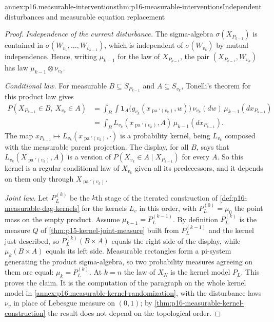 \begin{annexitem}{annex:p16.measurable-interventions}{thm:p16-measurable-interventions}{Independent disturbances and measurable equation replacement}
\begin{proof}
\emph{Independence of the current disturbance.} The sigma-algebra
\(\sigma(X_{P_{k-1}})\) is contained in
\(\sigma(W_{v_1},\ldots,W_{v_{k-1}})\), which is independent of
\(\sigma(W_{v_k})\) by mutual independence. Hence, writing \(\mu_{k-1}\)
for the law of \(X_{P_{k-1}}\), the pair \((X_{P_{k-1}},W_{v_k})\) has law
\(\mu_{k-1}\otimes\nu_{v_k}\).

\emph{Conditional law.} For measurable \(B\subseteq S_{P_{k-1}}\) and
\(A\subseteq S_{v_k}\), Tonelli's theorem for this product law gives
\[
\begin{aligned}
 P(X_{P_{k-1}}\in B,\ X_{v_k}\in A)
 &=\int_B\int\mathbf 1_A\bigl(g_{v_k}(x_{\operatorname{pa}'(v_k)},w)\bigr)
     \,\nu_{v_k}(dw)\,\mu_{k-1}(dx_{P_{k-1}})\\
 &=\int_B L_{v_k}(x_{\operatorname{pa}'(v_k)},A)\,
     \mu_{k-1}(dx_{P_{k-1}}).
\end{aligned}
\]
The map \(x_{P_{k-1}}\mapsto L_{v_k}(x_{\operatorname{pa}'(v_k)},\cdot)\)
is a probability kernel, being \(L_{v_k}\) composed with the measurable
parent projection. The display, for all \(B\), says that
\(L_{v_k}(X_{\operatorname{pa}'(v_k)},A)\) is a version of
\(P(X_{v_k}\in A\mid X_{P_{k-1}})\) for every \(A\). So this kernel is a
regular conditional law of \(X_{v_k}\) given all its predecessors, and it
depends on them only through \(X_{\operatorname{pa}'(v_k)}\).

\emph{Joint law.} Let \(P_L^{(k)}\) be the \(k\)th stage of the iterated
construction of \cref{def:p16-measurable-dag-kernels} for the kernels
\(L_v\) in this order, with \(P_L^{(0)}=\mu_0\) the point mass on the
empty product. Assume \(\mu_{k-1}=P_L^{(k-1)}\). By definition
\(P_L^{(k)}\) is the measure \(Q\) of \cref{thm:p15-kernel-joint-measure}
built from \(P_L^{(k-1)}\) and the kernel just described, so
\(P_L^{(k)}(B\times A)\) equals the right side of the display, while
\(\mu_k(B\times A)\) equals its left side. Measurable rectangles form a
pi-system generating the product sigma-algebra, so two probability
measures agreeing on them are equal: \(\mu_k=P_L^{(k)}\). At \(k=n\) the
law of \(X_N\) is the kernel model \(P_L\). This proves the claim. It is
the computation of the paragraph on the whole kernel model in
\cref{annex:p16.measurable-kernel-randomization}, with the disturbance
laws \(\nu_v\) in place of Lebesgue measure on \((0,1)\); by
\cref{thm:p16-measurable-kernel-construction} the result does not depend
on the topological order.


\end{proof}
\end{annexitem}
